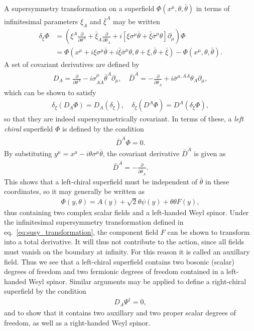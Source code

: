 \documentclass[twoside,english]{uiofysmaster}
\begin{document}
A supersymmetry transformation on a superfield $\Phi(x^\mu, \theta, \bar\theta)$ in terms of infinitesimal parameters $\xi_A$ and $\bar\xi^{\dot A}$ may be written
\begin{align}
	\delta_\xi \Phi &= \left( \xi^A \frac{\partial}{\partial \theta^A} + \bar\xi_{\dot A}\frac{\partial}{\partial \bar\theta_{\dot A}} + i\left[ \xi\sigma^\mu \bar\theta + \bar\xi \bar\sigma^\mu \theta  \right]\partial_\mu \right)\Phi\label{eq:susy_transformation}\\
	&= \Phi(x^\mu + i\xi\sigma^\mu\bar\theta + i\bar\xi \bar\sigma^\mu \theta, \theta + \xi, \bar\theta + \bar\xi) - \Phi(x^\mu, \theta, \bar\theta).\nonumber
\end{align}
A set of covariant derivatives are defined by
\begin{align}
	D_A = \frac{\partial}{\partial \theta^A} - i\sigma^\mu_{A \dot A}\bar\theta^{\dot A}\partial_\mu, \quad \bar D^{\dot A} = -\frac{\partial}{\partial \bar \theta_{\dot A}} + i\bar\sigma^{\mu,A \dot A}\theta_A \partial_\mu,
\end{align}
which can be shown to satisfy
\begin{align}
 	\delta_\xi (D_A \Phi) = D_A ( \delta_\xi ), \quad \delta_\xi (D^{\dot A} \Phi ) = D^{\dot A} ( \delta_\xi \Phi),
 \end{align}
 so that they are indeed supersymmetrically covariant. In terms of these, a {\it left chiral} superfield $\Phi$ is defined by the condition
\begin{align}
	\bar D^{\dot A} \Phi = 0.
\end{align}
By substituting $y^\mu = x^\mu - i\theta\sigma^\mu \bar \theta$, the covariant derivative $\bar D^{\dot A}$ is given as
\begin{align}
	\bar D^{\dot A} = -\frac{\partial}{\partial \bar\theta_{\dot A}}.
\end{align}
This shows that a left-chiral superfield must be independent of $\bar \theta$ in these coordinates, so it may generally be written as
\begin{align}
	\Phi(y, \theta) = A(y) + \sqrt{2}\theta\psi(y) + \theta\theta F(y), 
\end{align}
thus containing two complex scalar fields and a left-handed Weyl spinor. Under the infinitesimal supersymmetry transformation defined in eq.\ \eqref{eq:susy_transformation}, the component field $F$ can be shown to transform into a total derivative. It will thus not contribute to the action, since all fields must vanish on the boundary at infinity. For this reason it is called an auxillary field. Thus we see that a left-chiral superfield contains two bosonic (scalar) degrees of freedom and two fermionic degrees of freedom contained in a left-handed Weyl spinor. Similar arguments may be applied to define a right-chiral superfield by the condition
\begin{align}
	D_A \Psi^\dag = 0,
\end{align}
and to show that it contains two auxillary and two proper scalar degrees of freedom, as well as a right-handed Weyl spinor. 
\end{document}
